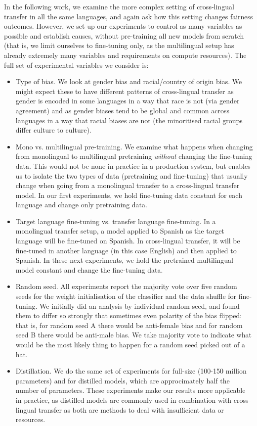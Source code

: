 In the following work, we examine the more complex setting of cross-lingual transfer in all the same languages, and again ask how this setting changes fairness outcomes. However, we set up our experiments to control as many variables as possible and establish causes, without pre-training all new models from scratch (that is, we limit ourselves to fine-tuning only, as the multilingual setup has already extremely many variables and requirements on compute resources). The full set of experimental variables we consider is:
\begin{itemize}
    \item Type of bias. We look at gender bias and racial/country of origin bias. We might expect these to have different patterns of cross-lingual transfer as gender is encoded in some languages in a way that race is not (via gender agreement) and as gender biases tend to be global and common across languages in a way that racial biases are not (the minoritised racial groups differ culture to culture).
    \item Mono vs. multilingual pre-training. We examine what happens when changing from monolingual to multilingual pretraining \textit{without} changing the fine-tuning data. This would not be none in practice in a production system, but enables us to isolate the two types of data (pretraining and fine-tuning) that usually change when going from a monolingual transfer to a cross-lingual transfer model. In our first experiments, we hold fine-tuning data constant for each language and change only pretraining data.
    \item Target language fine-tuning vs. transfer language fine-tuning. In a monolingual transfer setup, a model applied to Spanish as the target language will be fine-tuned on Spanish. In cross-lingual transfer, it will be fine-tuned in another language (in this case English) and then applied to Spanish. In these next experiments, we hold the pretrained multilingual model constant and change the fine-tuning data.
    \item Random seed. All experiments report the majority vote over five random seeds for the weight initialisation of the classifier and the data shuffle for fine-tuning. We initially did an analysis by individual random seed, and found them to differ so strongly that sometimes even polarity of the bias flipped: that is, for random seed A there would be anti-female bias and for random seed B there would be anti-male bias. We take majority vote to indicate what would be the most likely thing to happen for a random seed picked out of a hat.
    \item Distillation. We do the same set of experiments for full-size (100-150 million parameters) and for distilled models, which are approcimately half the number of parameters. These experiments make our results more applicable in practice, as distilled models are commonly used in combination with cross-lingual transfer as both are methods to deal with insufficient data or resources.

\end{itemize}


